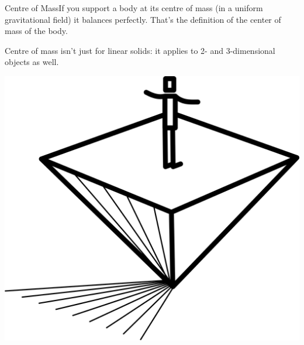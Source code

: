 \begin{frame}[t]
\begin{block}{Centre of Mass}If you support a body at its centre of mass (in a uniform gravitational
field) it balances perfectly. That's the definition of the center of mass
of the body.\end{block}
Centre of mass isn't just for linear solids: it applies to 2- and 3-dimensional objects as well. 

\begin{center}
\includegraphics[width=.5\textwidth]{clipart/balancing}
\end{center}
\end{frame}

